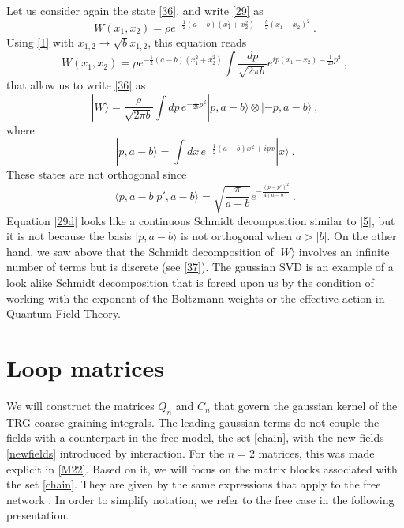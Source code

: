 \documentclass[a4paper,preprintnumbers,nofootinbib,twocolumn]{quantumarticle}
\def\beq{\begin{equation}}
\def\eeq{\end{equation}}
\begin{document}
Let us consider again the state \eqref{36}, and write  \eqref{29} as 
\beq
W(x_1, x_2) = \rho e^{ - \frac{1}{2} (a -b) (x_1^2 + x_2^2) - \frac{b}{2} (x_1 - x_2)^2} \ . 
\label{29b}
\eeq
Using \eqref{1} with $x_{1,2} \rightarrow \sqrt{b} x_{1,2}$, this equation  reads
\beq
W(x_1, x_2) = \rho e^{ - \frac{1}{2} (a -b) (x_1^2 + x_2^2)}   \int \frac{dp}{ \sqrt{2 \pi b}} e^{ i p( x_1 - x_2) - \frac{1}{2b} p^2} \ ,
\label{29c}
\eeq
that allow us to write \eqref{36} as 
\beq
| W \rangle = \frac{ \rho}{ \sqrt{ 2 \pi b} } \int dp \, e^{ - \frac{1}{2 b} p^2} |p, a-b \rangle \otimes |- p, a-b \rangle \ , 
\label{29d}
\eeq
where 
\beq 
| p, a-b \rangle = \int dx \,  e^{ - \frac{1}{2} ( a- b)  x^2  + i p x}  | x \rangle  \ .
\label{29e}
\eeq
These states are not orthogonal since
\beq
\langle p, a-b | p' , a-b \rangle = \sqrt{ \frac{ \pi }{a-b} } e^{ - \frac{ (p - p')^2}{ 4 (a-b)}} \ . 
\label{29f}
\eeq
Equation \eqref{29d} looks like  a continuous Schmidt decomposition  similar to \eqref{5}, 
but it is not because
the basis $|p, a-b\rangle$ is not orthogonal when $a > |b|$. On the other hand,  we saw above that the
Schmidt decomposition of $| W \rangle$ involves an infinite number of terms but is  discrete (see \eqref{37}).
The gaussian SVD is an example of a look alike Schmidt decomposition that is forced upon  us 
by the condition of working with the exponent of the Boltzmann weights or the effective action
in Quantum Field Theory.  


\section{Loop matrices}

We will construct the matrices $Q_n$ and $C_n$ that govern the gaussian kernel of the TRG coarse graining integrals. 
The leading gaussian terms do not couple the 
fields with a counterpart in the free model, the set \eqref{chain}, with the new fields \eqref{newfields} introduced by interaction. 
For the $n=2$ matrices, this was made explicit in \eqref{M22}.
Based on it, we will focus on the matrix blocks associated with the set \eqref{chain}.
They are given by the same expressions that apply to the free network \cite{}. 
In order to simplify notation, we refer to the free case in the following presentation.
\end{document}
